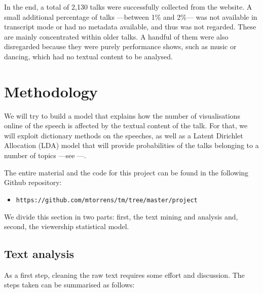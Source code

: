 \documentclass[a4paper, 11pt]{article} %
\begin{document}
In the end, a total of 2,130 talks were successfully collected from the website. A small additional percentage of talks ---between 1\% and 2\%--- was not available in transcript mode or had no metadata available, and thus was not regarded. These are mainly concentrated within older talks. A handful of them were also disregarded because they were purely performance shows, such as music or dancing, which had no textual content to be analysed.

\section*{Methodology}

We will try to build a model that explains how the number of visualisations online of the speech is affected by the textual content of the talk. For that, we will exploit dictionary methods on the speeches, as well as a Latent Dirichlet Allocation (LDA) model that will provide probabilities of the talks belonging to a number of topics ---see \cite{lda}---.

The entire material and the code for this project can be found in the following Github repository:

\begin{itemize}
\item \texttt{https://github.com/mtorrens/tm/tree/master/project}
\end{itemize}

We divide this section in two parts: first, the text mining and analysis and, second, the viewership statistical model.

\subsection*{Text analysis}

As a first step, cleaning the raw text requires some effort and discussion. The steps taken can be summarised as follows:
\end{document}
